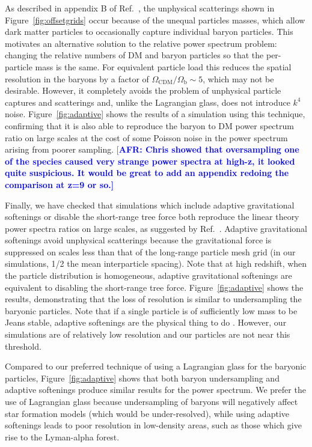 \documentclass[a4paper,11pt]{article}
\newcommand{\AFR}[1]{\textcolor{blue}{[\bf AFR: #1]} }
\begin{document}
As described in appendix B of Ref.~\cite{OLeary:2012}, the unphysical scatterings shown in Figure~\ref{fig:offsetgrids} occur because of the unequal particles masses, which allow dark matter particles to occasionally capture individual baryon particles. This motivates
an alternative solution to the relative power spectrum problem: changing the relative numbers of DM and baryon particles so that the per-particle mass is the same. For equivalent particle load this reduces the spatial resolution in the baryons by a factor of $\Omega_\mathrm{CDM}/\Omega_\mathrm{b} \sim 5$, which may not be desirable. However, it completely avoids the problem of unphysical particle captures and scatterings and, unlike the Lagrangian glass, does not introduce $k^4$ noise. Figure~\ref{fig:adaptive} shows the results of a simulation using this technique, confirming that it is also able to reproduce the baryon to DM power spectrum ratio on large scales at the cost of some Poisson noise in the power spectrum arising from poorer sampling.
\AFR{Chris showed that oversampling one of the species caused very strange power spectra at high-z, it looked quite suspicious. It would be great to add an appendix redoing the comparison at z=9 or so.}

Finally, we have checked that simulations which include adaptive gravitational softenings or disable the short-range tree force both reproduce the linear theory power spectra ratios on large scales, as suggested by Ref.~\cite{Angulo:2013}. Adaptive gravitational softenings avoid unphysical scatterings because the gravitational force is suppressed on scales less than that of the long-range particle mesh grid (in our simulations, 1/2 the mean interparticle spacing). Note that at high redshift, when the particle distribution is homogeneous, adaptive gravitational softenings are equivalent to disabling the short-range tree force.
Figure~\ref{fig:adaptive} shows the results, demonstrating that the loss of resolution is similar to undersampling the baryonic particles. Note that if a single particle is of sufficiently low mass to be Jeans stable, adaptive softenings are the physical thing to do \cite{Fire2:2018}. However, our simulations are of relatively low resolution and our particles are not near this threshold.

Compared to our preferred technique of using a Lagrangian glass for the baryonic particles, Figure~\ref{fig:adaptive} shows that both baryon undersampling and adaptive softenings produce similar results for the power spectrum. We prefer the use of Lagrangian glass because undersampling of baryons will negatively affect star formation models (which would be under-resolved), while using adaptive softenings leads to poor resolution in low-density areas, such as those which give rise to the Lyman-alpha forest.
\end{document}
